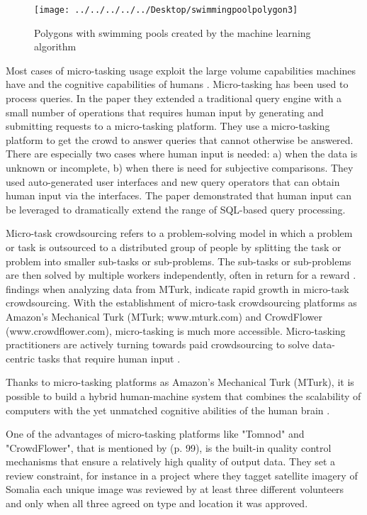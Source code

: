 \begin{figure}[H]
	\centering
	\texttt{[image: ../../../../../Desktop/swimmingpoolpolygon3]}
	\caption{Polygons with swimming pools created by the machine learning algorithm \citep{Nikki2016}}
	\label{fig:swimmingpoolpolygon3}
\end{figure}

Most cases of micro-tasking usage exploit the large volume capabilities machines have and the cognitive capabilities of humans \citep{Difallah2016}. Micro-tasking has been used to process queries. In the \cite{Franklin2011} paper they extended a traditional query engine with a small number of operations that requires human input by generating and submitting requests to a micro-tasking platform.  They use a micro-tasking platform to get the crowd to answer queries that cannot otherwise be answered. There are especially two cases where human input is needed: a) when the data is unknown or incomplete, b) when there is need for subjective comparisons. They used auto-generated user interfaces and new query operators that can obtain human input via the interfaces. The \cite{Franklin2011} paper demonstrated that human input can be leveraged to dramatically extend the range of SQL-based query processing. 

Micro-task crowdsourcing refers to a problem-solving model in which a problem or task is outsourced to a distributed group of people by splitting the task or problem into smaller sub-tasks or sub-problems. The sub-tasks or sub-problems are then solved by multiple workers independently, often in return for a reward \citep{Sarasua2012}. \cite{Gadiraju2015} findings when analyzing data from MTurk, indicate rapid growth in micro-task crowdsourcing. With the establishment of micro-task crowdsourcing platforms as Amazon's Mechanical Turk (MTurk; www.mturk.com) and CrowdFlower (www.crowdflower.com), micro-tasking is much more accessible. Micro-tasking practitioners are actively turning towards paid crowdsourcing to solve data-centric tasks that require human input \citep{Gadiraju2015}. 

Thanks to micro-tasking platforms as Amazon's Mechanical Turk (MTurk), it is possible to build a hybrid human-machine system that combines the scalability of computers with the yet unmatched cognitive abilities of the human brain \citep{Difallah2016}.

One of the advantages of micro-tasking platforms like "Tomnod" and "CrowdFlower", that is mentioned by \cite{Meier2013} (p. 99), is the built-in quality control mechanisms that ensure a relatively high quality of output data. They set a review constraint, for instance in a project where they tagget satellite imagery of Somalia each unique image was reviewed by at least three different volunteers and only when all three agreed on type and location it was approved. 

